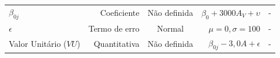 \documentclass[
  a4paper, 12pt]{article}
\begin{document}
\begin{longtable}[]{@{}lrcrc@{}}
\begin{minipage}[t]{0.18\columnwidth}\raggedright
\(\beta_{0j}\)\strut
\end{minipage} & \begin{minipage}[t]{0.12\columnwidth}\raggedleft
Coeficiente\strut
\end{minipage} & \begin{minipage}[t]{0.11\columnwidth}\centering
Não definida\strut
\end{minipage} & \begin{minipage}[t]{0.25\columnwidth}\raggedleft
\(\beta_0 + 3000A_V + \upsilon\)\strut
\end{minipage} & \begin{minipage}[t]{0.21\columnwidth}\centering
-\strut
\end{minipage}\tabularnewline
\begin{minipage}[t]{0.18\columnwidth}\raggedright
\(\epsilon\)\strut
\end{minipage} & \begin{minipage}[t]{0.12\columnwidth}\raggedleft
Termo de erro\strut
\end{minipage} & \begin{minipage}[t]{0.11\columnwidth}\centering
Normal\strut
\end{minipage} & \begin{minipage}[t]{0.25\columnwidth}\raggedleft
\(\mu = 0, \sigma = 100\)\strut
\end{minipage} & \begin{minipage}[t]{0.21\columnwidth}\centering
-\strut
\end{minipage}\tabularnewline
\begin{minipage}[t]{0.18\columnwidth}\raggedright
Valor Unitário (\(VU\))\strut
\end{minipage} & \begin{minipage}[t]{0.12\columnwidth}\raggedleft
Quantitativa\strut
\end{minipage} & \begin{minipage}[t]{0.11\columnwidth}\centering
Não definida\strut
\end{minipage} & \begin{minipage}[t]{0.25\columnwidth}\raggedleft
\(\beta_{0j} - 3,0 A + \epsilon\)\strut
\end{minipage} & \begin{minipage}[t]{0.21\columnwidth}\centering
-\strut
\end{minipage}\tabularnewline
\bottomrule
\end{longtable}
\end{document}
